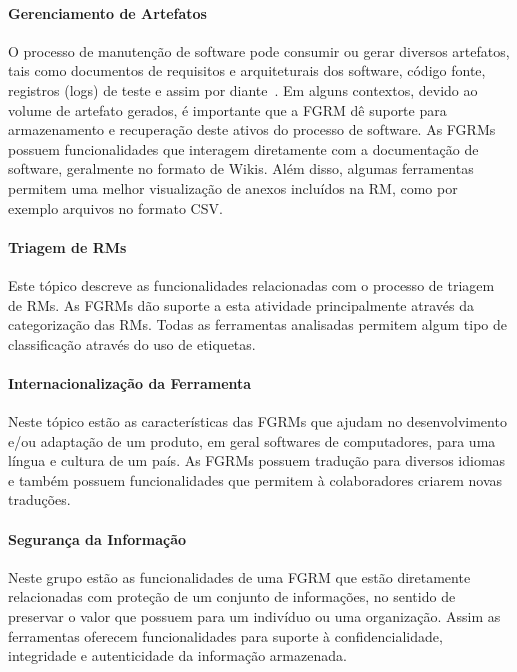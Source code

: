 \paragraph{Gerenciamento de Artefatos}
\label{par:gerenciamento_de_artefatos}

O processo de manutenção de software pode consumir ou gerar diversos artefatos,
tais como documentos de requisitos e arquiteturais dos software, código fonte,
registros (logs) de teste e assim por diante~\cite{cavalcanti2013bug}. Em alguns
contextos, devido ao volume de artefato gerados, é importante que a FGRM dê
suporte para armazenamento e recuperação deste ativos do processo de software.
As FGRMs possuem funcionalidades que interagem diretamente com a documentação
de software, geralmente no formato de Wikis. Além disso, algumas ferramentas
permitem uma melhor visualização de anexos incluídos na RM, como por
exemplo arquivos no formato CSV\@.

\paragraph{Triagem de RMs}
\label{par:triagem_de_rm_s}

Este tópico descreve as funcionalidades relacionadas com o processo de triagem
de RMs. As FGRMs dão suporte a esta atividade principalmente através da
categorização das RMs. Todas as ferramentas analisadas permitem algum tipo de
classificação através do uso de etiquetas.

\paragraph{Internacionalização da Ferramenta}
\label{par:internacionalização_da_ferramenta}

Neste tópico estão as características das FGRMs que ajudam no desenvolvimento
e/ou adaptação de um produto, em geral softwares de computadores, para uma
língua e cultura de um país. As FGRMs possuem tradução para diversos idiomas e
também possuem funcionalidades que permitem à colaboradores criarem novas
traduções.

\paragraph{Segurança da Informação}
\label{par:segurança_da_informação}

Neste grupo estão as funcionalidades de uma FGRM que estão diretamente
relacionadas com proteção de um conjunto de informações, no sentido de preservar
o valor que possuem para um indivíduo ou uma organização. Assim as ferramentas
oferecem funcionalidades para suporte à confidencialidade, integridade e
autenticidade da informação armazenada.

